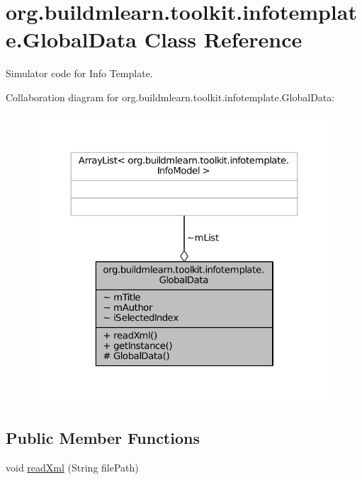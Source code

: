 \hypertarget{classorg_1_1buildmlearn_1_1toolkit_1_1infotemplate_1_1GlobalData}{\section{org.\-buildmlearn.\-toolkit.\-infotemplate.\-Global\-Data Class Reference}
\label{classorg_1_1buildmlearn_1_1toolkit_1_1infotemplate_1_1GlobalData}
}


Simulator code for Info Template.  




Collaboration diagram for org.\-buildmlearn.\-toolkit.\-infotemplate.\-Global\-Data\-:
\nopagebreak
\begin{figure}[H]
\begin{center}
\leavevmode
\includegraphics[width=324pt]{da/dc4/classorg_1_1buildmlearn_1_1toolkit_1_1infotemplate_1_1GlobalData__coll__graph}
\end{center}
\end{figure}
\subsection*{Public Member Functions}
\begin{DoxyCompactItemize}
\item 
void \hyperlink{classorg_1_1buildmlearn_1_1toolkit_1_1infotemplate_1_1GlobalData_abbf66139873f5feda47d3acac99d84c3}{read\-Xml} (String file\-Path)
\end{DoxyCompactItemize}
